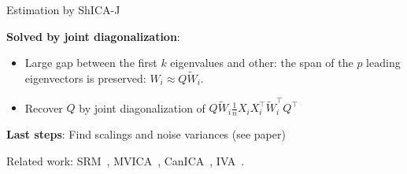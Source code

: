 \documentclass[final]{beamer}
\newlength{\onecolwid}
\newlength{\onecolwidtwo}
\begin{document}
\begin{frame}[t]
\begin{columns}[t]
\begin{column}{\onecolwidtwo}
\begin{block}{Estimation by ShICA-J}
    \vspace{0.5em}

    \textbf{Solved by joint diagonalization}:
    \begin{itemize}
    \item Large gap between the first $k$ eigenvalues and other: the span of the
      $p$ leading eigenvectors is preserved: 
      $W_i \approx Q \tilde{W}_i$.
    \item Recover $Q$ by joint diagonalization of $Q \tilde{W}_i \frac1{n}X_i X_i^{\top} \tilde{W}_i^{\top}Q^{\top}$
    \end{itemize}

    \vspace{0.5em}
    \textbf{Last steps}: Find scalings and noise variances (see paper)
  \end{block}

  Related work: SRM~\cite{chen2015reduced}, MVICA~\cite{richard2020modeling},
  CanICA~\cite{varoquaux2010group}, IVA~\cite{anderson2014independent}.
  

\end{column}
\end{columns}
\end{frame}
\end{document}
